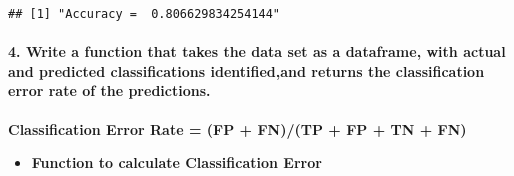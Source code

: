 \documentclass[]{article}
\newenvironment{Shaded}{\begin{snugshade}}{\end{snugshade}}
\newcommand{\ControlFlowTok}[1]{\textcolor[rgb]{0.13,0.29,0.53}{\textbf{#1}}}
\newcommand{\KeywordTok}[1]{\textcolor[rgb]{0.13,0.29,0.53}{\textbf{#1}}}
\newcommand{\NormalTok}[1]{#1}
\newcommand{\OperatorTok}[1]{\textcolor[rgb]{0.81,0.36,0.00}{\textbf{#1}}}
\newcommand{\StringTok}[1]{\textcolor[rgb]{0.31,0.60,0.02}{#1}}
\providecommand{\tightlist}{%
  \setlength{\itemsep}{0pt}\setlength{\parskip}{0pt}}
\let\oldparagraph\paragraph
\renewcommand{\paragraph}[1]{\oldparagraph{#1}\mbox{}}
\begin{document}
\begin{Shaded}
\end{Shaded}

\begin{verbatim}
## [1] "Accuracy =  0.806629834254144"
\end{verbatim}

\hypertarget{write-a-function-that-takes-the-data-set-as-a-dataframe-with-actual-and-predicted-classifications-identifiedand-returns-the-classification-error-rate-of-the-predictions.}{%
\paragraph{4. Write a function that takes the data set as a dataframe,
with actual and predicted classifications identified,and returns the
classification error rate of the
predictions.}\label{write-a-function-that-takes-the-data-set-as-a-dataframe-with-actual-and-predicted-classifications-identifiedand-returns-the-classification-error-rate-of-the-predictions.}}

\textbf{Classification Error Rate = (FP + FN)/(TP + FP + TN + FN)}

\begin{itemize}
\tightlist
\item
  \textbf{Function to calculate Classification Error}
\end{itemize}
\end{document}
